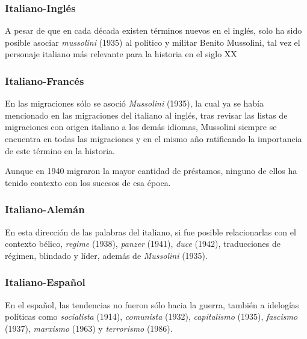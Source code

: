 \subsubsection*{Italiano-Inglés}%

A pesar de que en cada década existen términos nuevos en el inglés, solo ha sido posible asociar \textit{mussolini} (1935) al político y militar Benito Mussolini, tal vez el personaje italiano más relevante para la historia en el siglo XX 

\subsubsection*{Italiano-Francés}%



En las migraciones sólo se asoció \textit{Mussolini} (1935), la cual ya se había mencionado en las migraciones del italiano al inglés, tras revisar las listas de migraciones con origen italiano  a los demás idiomas, Mussolini siempre se encuentra en todas las migraciones y en el mismo año ratificando la importancia de este término en la historia. 

Aunque en 1940 migraron la mayor cantidad de préstamos, ninguno de ellos ha tenido contexto con los sucesos de esa época. 

\subsubsection*{Italiano-Alemán}%

En esta dirección de las palabras del italiano, si fue posible relacionarlas con el contexto bélico,  \textit{regime} (1938), \textit{panzer} (1941), \textit{duce} (1942),  traducciones de régimen, blindado y líder, además de \textit{Mussolini} (1935). 



\subsubsection*{Italiano-Español}%

En el español, las tendencias no fueron sólo hacia la guerra, también a idelogías políticas como \textit{socialista} (1914), \textit{comunista} (1932), \textit{capitalismo} (1935), \textit{fascismo} (1937),  \textit{marxismo} (1963) y \textit{terrorismo} (1986). 




\clearpage
